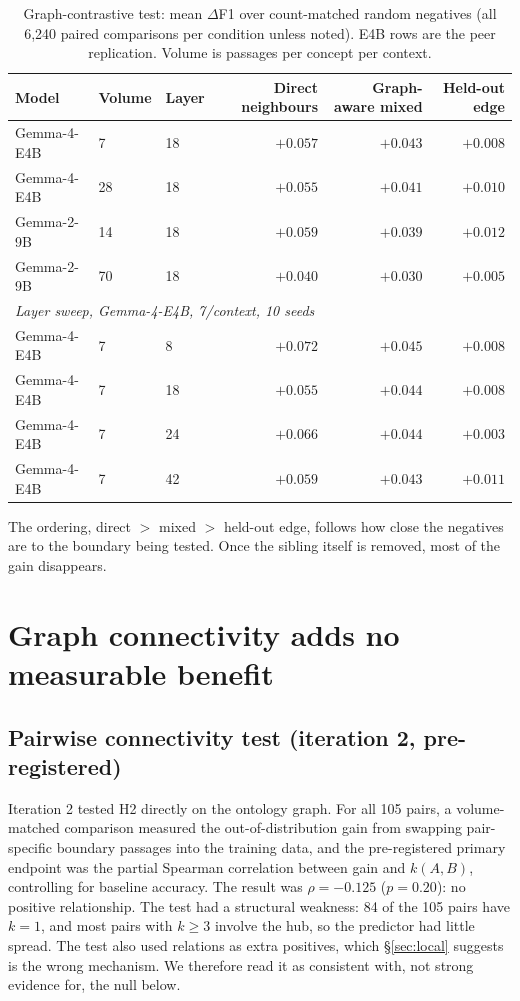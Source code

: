 \documentclass[11pt]{article}
\newcommand{\dF}{$\Delta$F1}
\begin{document}
\begin{table}[t]
  \centering
  \small
  \caption{Graph-contrastive test: mean \dF{} over count-matched random negatives (all 6,240 paired comparisons
  per condition unless noted). E4B rows are the peer replication. Volume is passages per concept per context.}
  \label{tab:contrastive}
  \begin{tabular}{lllrrr}
    \toprule
    Model & Volume & Layer & Direct neighbours & Graph-aware mixed & Held-out edge \\
    \midrule
    Gemma-4-E4B & 7  & 18 & $+0.057$ & $+0.043$ & $+0.008$ \\
    Gemma-4-E4B & 28 & 18 & $+0.055$ & $+0.041$ & $+0.010$ \\
    Gemma-2-9B  & 14 & 18 & $+0.059$ & $+0.039$ & $+0.012$ \\
    Gemma-2-9B  & 70 & 18 & $+0.040$ & $+0.030$ & $+0.005$ \\
    \midrule
    \multicolumn{6}{l}{\emph{Layer sweep, Gemma-4-E4B, 7/context, 10 seeds}} \\
    Gemma-4-E4B & 7 & 8  & $+0.072$ & $+0.045$ & $+0.008$ \\
    Gemma-4-E4B & 7 & 18 & $+0.055$ & $+0.044$ & $+0.008$ \\
    Gemma-4-E4B & 7 & 24 & $+0.066$ & $+0.044$ & $+0.003$ \\
    Gemma-4-E4B & 7 & 42 & $+0.059$ & $+0.043$ & $+0.011$ \\
    \bottomrule
  \end{tabular}
\end{table}

The ordering, direct $>$ mixed $>$ held-out edge, follows how close the negatives are to the boundary being
tested. Once the sibling itself is removed, most of the gain disappears.

\section{Graph connectivity adds no measurable benefit}
\label{sec:connectivity}

\subsection{Pairwise connectivity test (iteration 2, pre-registered)}
Iteration 2 tested H2 directly on the ontology graph. For all 105 pairs, a volume-matched comparison measured
the out-of-distribution gain from swapping pair-specific boundary passages into the training data, and the
pre-registered primary endpoint was the partial Spearman correlation between gain and $k(A,B)$, controlling for
baseline accuracy. The result was $\rho = -0.125$ ($p=0.20$): no positive relationship. The test had a structural
weakness: 84 of the 105 pairs have $k=1$, and most pairs with $k\ge 3$ involve the hub, so the predictor had little
spread. The test also used relations as extra positives, which \S\ref{sec:local} suggests is the wrong mechanism.
We therefore read it as consistent with, not strong evidence for, the null below.
\end{document}

